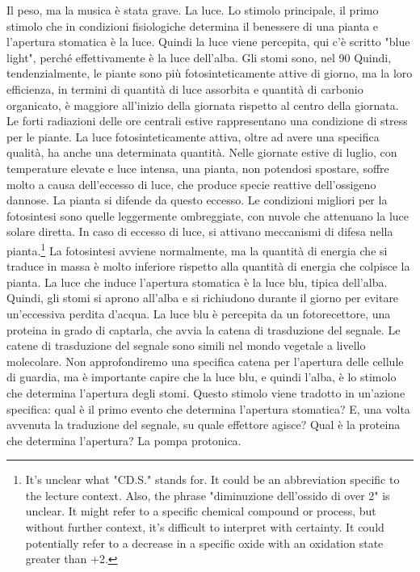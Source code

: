 \documentclass[11pt, a4paper]{article}
\begin{document}
\begin{spacing}{1.15}
Il peso, ma la musica è stata grave. La luce. Lo stimolo principale, il primo stimolo che in condizioni fisiologiche determina il benessere di una pianta e l'apertura stomatica è la luce. Quindi la luce viene percepita, qui c'è scritto "blue light", perché effettivamente è la luce dell'alba. Gli stomi sono, nel 90%
Quindi, tendenzialmente, le piante sono più fotosinteticamente attive di giorno, ma la loro efficienza, in termini di quantità di luce assorbita e quantità di carbonio organicato, è maggiore all'inizio della giornata rispetto al centro della giornata. Le forti radiazioni delle ore centrali estive rappresentano una condizione di stress per le piante. La luce fotosinteticamente attiva, oltre ad avere una specifica qualità, ha anche una determinata quantità. Nelle giornate estive di luglio, con temperature elevate e luce intensa, una pianta, non potendosi spostare, soffre molto a causa dell'eccesso di luce, che produce specie reattive dell'ossigeno dannose. La pianta si difende da questo eccesso. Le condizioni migliori per la fotosintesi sono quelle leggermente ombreggiate, con nuvole che attenuano la luce solare diretta. In caso di eccesso di luce, si attivano meccanismi di difesa nella pianta.\footnote{It's unclear what "CD.S." stands for. It could be an abbreviation specific to the lecture context. Also, the phrase "diminuzione dell'ossido di over 2" is unclear. It might refer to a specific chemical compound or process, but without further context, it's difficult to interpret with certainty. It could potentially refer to a decrease in a specific oxide with an oxidation state greater than +2.}
La fotosintesi avviene normalmente, ma la quantità di energia che si traduce in massa è molto inferiore rispetto alla quantità di energia che colpisce la pianta. La luce che induce l'apertura stomatica è la luce blu, tipica dell'alba. Quindi, gli stomi si aprono all'alba e si richiudono durante il giorno per evitare un'eccessiva perdita d'acqua. La luce blu è percepita da un fotorecettore, una proteina in grado di captarla, che avvia la catena di trasduzione del segnale. Le catene di trasduzione del segnale sono simili nel mondo vegetale a livello molecolare. Non approfondiremo una specifica catena per l'apertura delle cellule di guardia, ma è importante capire che la luce blu, e quindi l'alba, è lo stimolo che determina l'apertura degli stomi. Questo stimolo viene tradotto in un'azione specifica: qual è il primo evento che determina l'apertura stomatica? E, una volta avvenuta la traduzione del segnale, su quale effettore agisce? Qual è la proteina che determina l'apertura? La pompa protonica.

\end{spacing}
\end{document}
